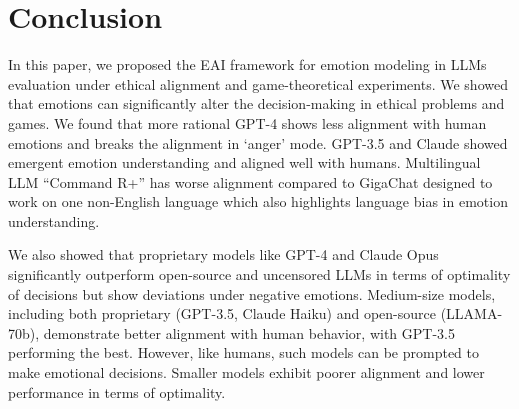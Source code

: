 \documentclass{article}
\begin{document}









\section{Conclusion}

In this paper, we proposed the EAI framework %
for emotion modeling in LLMs evaluation under ethical alignment and game-theoretical experiments. We showed that %
emotions can significantly alter the decision-making in ethical problems and games. We found that more rational GPT-4 shows less alignment with human emotions and breaks the alignment in `anger' mode. GPT-3.5 and Claude showed emergent emotion understanding and aligned well with humans. %
Multilingual LLM ``Command R+'' has worse alignment compared to GigaChat designed to work on one non-English language which also highlights language bias in emotion understanding. 

We also showed that proprietary models like GPT-4 and Claude Opus significantly outperform open-source and uncensored LLMs in terms of optimality of decisions but show deviations under negative emotions. Medium-size models, including both proprietary (GPT-3.5, Claude Haiku) and open-source (LLAMA-70b), demonstrate better alignment with human behavior, with GPT-3.5 performing the best. However, like humans, such models can be prompted to make emotional decisions. Smaller models exhibit poorer alignment and lower performance in terms of optimality.
\end{document}
